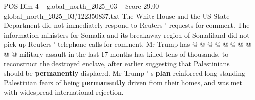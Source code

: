 \begin{textsample}{POS Dim 4 – global\_north\_2025\_03 – Score 29.00 – global\_north\_2025\_03/122350837.txt}
The White House and the US State Department did not immediately respond to Reuters ' requests for comment.
The information ministers for Somalia and its breakaway region of Somaliland did not pick up Reuters ' telephone calls for comment.
Mr Trump has @ @ @ @ @ @ @ @ @ @ military assault in the last 17 months has killed tens of thousands, to reconstruct the destroyed enclave, after earlier suggesting that Palestinians should be \textbf{permanently} displaced.
Mr Trump ' s \textbf{plan} reinforced long-standing Palestinian fears of being \textbf{permanently} driven from their homes, and was met with widespread international rejection.

\end{textsample}
